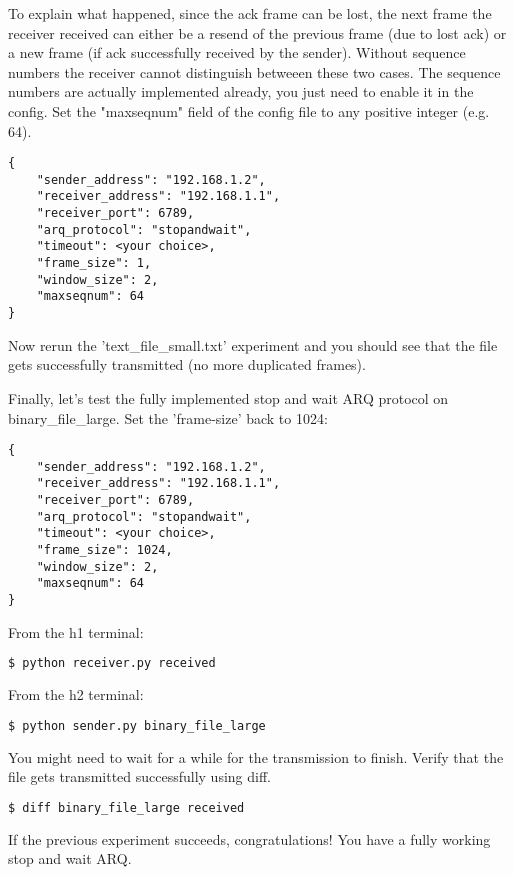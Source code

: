 \documentclass[11pt]{article}
\begin{document}
To explain what happened, since the ack frame can be lost, the next frame the receiver received can either be a resend of the previous frame (due to lost ack) or a new frame (if ack successfully received by the sender). Without sequence numbers the receiver cannot distinguish betweeen these two cases. The sequence numbers are actually implemented already, you just need to enable it in the config. Set the "maxseqnum" field of the config file to any positive integer (e.g. 64).

\begin{lstlisting}[caption={Configuration For Large File}]
{
    "sender_address": "192.168.1.2",
    "receiver_address": "192.168.1.1",
    "receiver_port": 6789,
    "arq_protocol": "stopandwait",
    "timeout": <your choice>,
    "frame_size": 1,
    "window_size": 2,
    "maxseqnum": 64
}
\end{lstlisting}

Now rerun the 'text\_file\_small.txt' experiment and you should see that the file gets successfully transmitted (no more duplicated frames).

Finally, let's test the fully implemented stop and wait ARQ protocol on binary\_file\_large. Set the 'frame-size' back to 1024:

\begin{lstlisting}[caption={Configuration For Large File}]
{
    "sender_address": "192.168.1.2",
    "receiver_address": "192.168.1.1",
    "receiver_port": 6789,
    "arq_protocol": "stopandwait",
    "timeout": <your choice>,
    "frame_size": 1024,
    "window_size": 2,
    "maxseqnum": 64
}
\end{lstlisting}
From the h1 terminal:
\begin{lstlisting}[language=bash]
$ python receiver.py received
\end{lstlisting}
From the h2 terminal:
\begin{lstlisting}[language=bash]
$ python sender.py binary_file_large
\end{lstlisting}

\noindent You might need to wait for a while for the transmission to finish. Verify that the file gets transmitted successfully using diff.
\begin{lstlisting}[language=bash]
$ diff binary_file_large received
\end{lstlisting}

\noindent If the previous experiment succeeds, congratulations! You have a fully working stop and wait ARQ.
\end{document}
